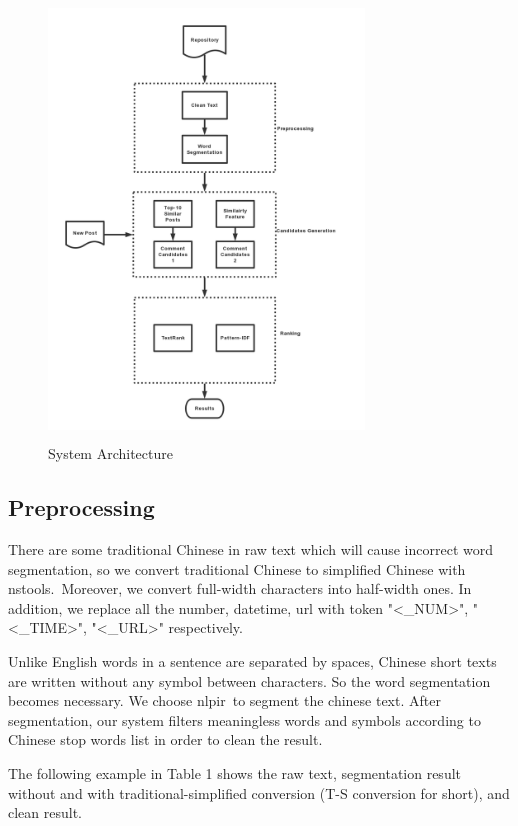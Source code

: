 \documentclass{sig-alternate}
\begin{document}
\begin{figure}
  \includegraphics[height=4.6in, width=3.3in]{stc-flow.png}
  \caption{System Architecture}
\end{figure}

\subsection{Preprocessing}
There are some traditional Chinese in raw text which will cause incorrect 
word segmentation, so we convert traditional Chinese to simplified Chinese with 
nstools\footnotemark.\ Moreover, we convert full-width characters into half-width
ones. In addition, we replace all the number, datetime, url with token "<\_NUM>", 
"<\_TIME>", "<\_URL>" respectively.

Unlike English words in a sentence are separated by spaces, Chinese short texts 
are written without any symbol between characters. So the word segmentation 
becomes necessary. We choose nlpir\footnotemark\ to segment the chinese text. 
After segmentation, our system filters meaningless words and symbols according 
to Chinese stop words list in order to clean the result.

The following example in Table 1 shows the raw text, segmentation result 
without and with traditional-simplified conversion (T-S conversion for short), 
and clean result.
\end{document}
